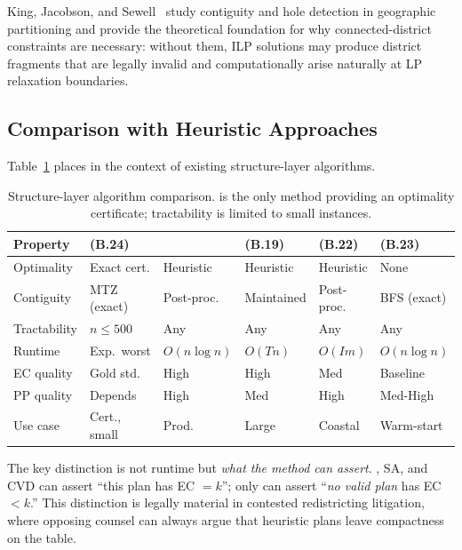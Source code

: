 King, Jacobson, and Sewell~\citeyear{king2015} study contiguity and
hole detection in geographic partitioning and provide the theoretical
foundation for why connected-district constraints are necessary:
without them, ILP solutions may produce district fragments that are
legally invalid and computationally arise naturally at LP relaxation
boundaries.

\subsection{Comparison with Heuristic Approaches}

Table~\ref{tab:method-compare} places \ilp{} in the context of existing
structure-layer algorithms.

\begin{table}[t]
\centering
\caption{%
  Structure-layer algorithm comparison. \ilp{} is the only method providing
  an optimality certificate; tractability is limited to small instances.
}
\label{tab:method-compare}
\renewcommand{\arraystretch}{1.3}
\begin{tabular}{@{}llllll@{}}
\toprule
Property & \ilp{} (B.24) & \metis{} & \sa{} (B.19) & \cvd{} (B.22) & \bfsg{} (B.23) \\
\midrule
Optimality    & Exact cert. & Heuristic & Heuristic & Heuristic & None \\
Contiguity    & MTZ (exact) & Post-proc. & Maintained & Post-proc. & BFS (exact) \\
Tractability  & $n \leq 500$ & Any & Any & Any & Any \\
Runtime       & Exp.\ worst & $O(n \log n)$ & $O(T n)$ & $O(I m)$ & $O(n \log n)$ \\
EC quality    & Gold std.   & High & High & Med & Baseline \\
PP quality    & Depends     & High & Med & High & Med-High \\
Use case      & Cert., small & Prod. & Large & Coastal & Warm-start \\
\bottomrule
\end{tabular}
\end{table}

The key distinction is not runtime but \emph{what the method can assert}.
\metis{}, SA, and CVD can assert ``this plan has EC $= k$''; only \ilp{}
can assert ``\emph{no valid plan} has EC $< k$.''
This distinction is legally material in contested redistricting litigation,
where opposing counsel can always argue that heuristic plans leave
compactness on the table.
